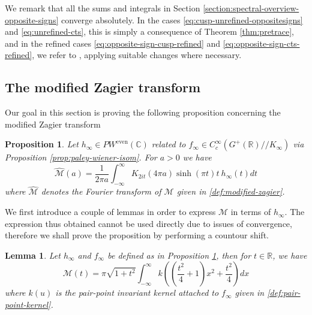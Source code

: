 \documentclass{article}
\newtheorem{lemma}[theorem]{Lemma}
\newtheorem{proposition}[theorem]{Proposition}
\numberwithin{equation}{section}
\begin{document}
We remark that all the sums and integrals in Section \ref{section:spectral-overview-opposite-signs} converge absolutely. In the cases \eqref{eq:cusp-unrefined-oppositesigns} and \eqref{eq:unrefined-cts}, this is simply a consequence of Theorem \ref{thm:pretrace}, and in the refined cases \eqref{eq:opposite-sign-cusp-refined} and \eqref{eq:opposite-sign-cts-refined}, we refer to \cite[\S 7.1 to 7.4]{KL-kuznetsov}, applying suitable changes where necessary.

\subsection{The modified Zagier transform}
Our goal in this section is proving the following proposition concerning the modified Zagier transform

\begin{proposition}\label{prop:DtoHtransform}
    Let $h_\infty\in PW^{\operatorname{even}}(\mathbb{C})$ related to $f_\infty \in C_c^\infty(G^+(\mathbb{R})//K_\infty)$ via Proposition \ref{prop:paley-wiener-isom}. For $a>0$ we have
    \begin{equation}
        \widehat{\mathcal{M}}(a)=\frac{1}{2\pi a}\int_{-\infty}^{\infty}K_{2it}(4\pi a)\sinh(\pi t)t \ h_\infty(t)dt
    \end{equation}
    where $\widehat{\mathcal{M}}$ denotes the Fourier transform of $\mathcal{M}$ given in \eqref{def:modified-zagier}.
\end{proposition}
We first introduce a couple of lemmas in order to express $\mathcal{M}$ in terms of $h_\infty$. The expression thus obtained cannot be used directly due to issues of convergence, therefore we shall prove the proposition by performing a countour shift.

\begin{lemma}\label{lemma:D-to-kernel}
    Let $ h_\infty$ and $f_\infty$ be defined as in Proposition \ref{prop:DtoHtransform}, then for $t \in \mathbb{R}$, we have
    \begin{equation}
        \mathcal{M}(t)=\pi\sqrt{1+t^2}\int_{-\infty}^{\infty}k(\left(\frac{t^2}{4}+1\right)x^2+\frac{t^2}{4})dx
    \end{equation}
    where $k(u)$ is the pair-point invariant kernel attached to $f_\infty$ given in \eqref{def:pair-point-kernel}.
\end{lemma}
\end{document}
